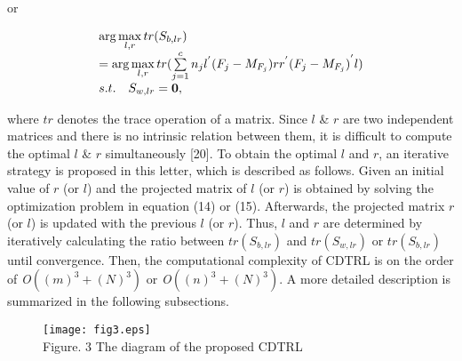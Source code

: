 \documentclass[journal]{IEEEtran}
\begin{document}
or
\begin{small}
\begin{equation}
\begin{array}{l}
 \arg \mathop {\max }\limits_{l,r} tr({S_{b,lr}}) \\
  = \arg \mathop {\max }\limits_{l,r} tr(\sum\limits_{j = 1}^c {{n_j}{l^{'}}({F_j} - {M_{{F_j}}})r{r^{'}}{{({F_j} - {M_{{F_j}}})}^{'}}l} )\\
 s.t.\quad{\rm{ }}{S_{w,lr}} = {\bf{0}}, \\
 \end{array}
\end{equation}
\end{small}
where $tr$ denotes the trace operation of a matrix. Since $l$ \& $r$ are two independent matrices and there is no intrinsic relation between them, it is difficult to compute the optimal $l$ \& $r$ simultaneously [20]. To obtain the optimal $l$ and $r$, an iterative strategy is proposed in this letter, which is described as follows. Given an initial value of $r$ (or $l$) and the projected matrix of $l$ (or $r$) is obtained by solving the optimization problem in equation (14) or (15). Afterwards, the projected matrix $r$ (or $l$) is updated with the previous $l$ (or $r$). Thus, $l$ and $r$ are determined by iteratively calculating the ratio between $tr({S_{b,lr}})$ and $tr({S_{w,lr}})$ or $tr({S_{b,lr}})$ until convergence. Then, the computational complexity of CDTRL is on the order of \emph{O$((m)^{3}+(N)^{3})$} or \emph{O$((n)^{3}+(N)^{3})$}. A more detailed description is summarized in the following subsections.
\begin{figure*}[t]
\centering
\texttt{[image: fig3.eps]}\\ Figure. 3 The diagram of the proposed CDTRL\\
\end{figure*}
\end{document}
